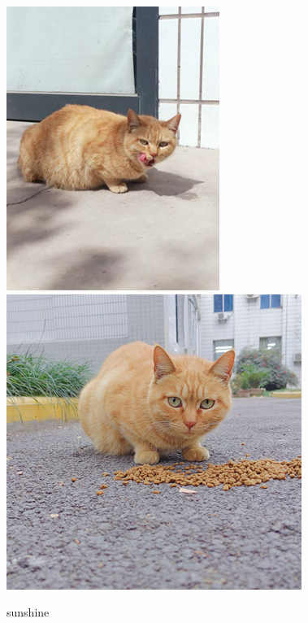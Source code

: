 \documentclass[zihao=-4,fontset=none]{Beautybook-CN}
\begin{document}
\begin{enumerate}
\begin{figure}[htbp]
            \centering
            \includegraphics[width=0.4\linewidth]{media/cimage41.png}
        \qquad
            \includegraphics[width=0.4\linewidth]{media/cimage42.png}
            \caption{sunshine}
            \label{img4142}
    \end{figure}
    \end{enumerate}
\end{document}
